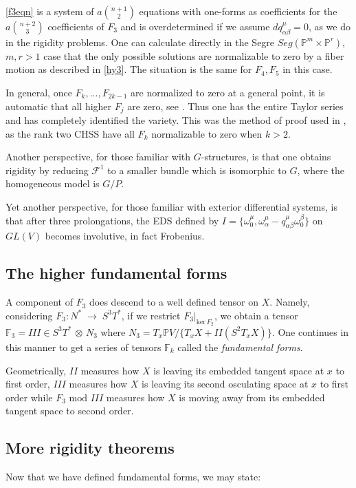\documentclass[11pt]{amsart}
\theoremstyle{definition}
\theoremstyle{remark}
\numberwithin{equation}{section}
\def\ooo#1#2{\omega^{#1}_{#2}}\def\xxx#1#2{x^{#1}_{#2}}
\def\oo#1{\omega^{#1}_0}
\def\qq#1#2#3{q^{#1}_{{#2} {#3}}}
\def\cf{\mathcal F}
\def\BP{\mathbb P}
\def\pp#1{\mathbb P^{#1}}
\def\pp#1{{\mathbb P}^{#1}}
\def\hd{,...,}
\def\FF{\mathbb F}
\def\a{\alpha}
\def\b{\beta}
\def\ot{{\mathord{\,\otimes }\,}}
\def\ra{{\mathord{\;\rightarrow\;}}}
\def\tker{\text{ker}\,}
\def\tmod{\text{ mod }}
\begin{document}
\smallskip

\eqref{f3eqn} is a system of $a\binom{n+1}2$ equations
with one-forms as coefficients for the $a\binom{n+2}3$ coefficients
of $F_3$ and is overdetermined if we assume $d\qq\mu\a\b=0$, as we do
in the rigidity problems. One can calculate
directly  in the Segre
$Seg(\pp m\times \pp r)$, $m,r>1$ case that the only possible solutions are normalizable to zero
by a fiber motion as described in \eqref{hy3}. The situation is the same for $F_4,F_5$
in this case.

In general, once $F_k\hd F_{2k-1}$ are normalized to zero at a general point,
it is automatic that all higher $F_j$ are zero, see \cite{Lci}.
Thus one has the entire Taylor series and has completely identified the variety.
This was the method of proof used in \cite{Lrigid}, as the rank two
CHSS have all $F_k$ normalizable to zero when $k>2$.

Another perspective, for those familiar with $G$-structures, is that one
obtains rigidity by reducing   $\cf^1$ to a smaller bundle which is isomorphic to $G$, where the
homogeneous model is $G/P$.

Yet another perspective, for those familiar with exterior differential systems,
is that after three prolongations, the EDS defined by $I=\{\oo\mu,\ooo\mu\a-\qq\mu\a\b\oo\b\}$
on $GL(V)$ becomes involutive, in fact Frobenius.


\subsection{The higher fundamental forms}\label{ffsect}
A component of  $F_3$ does descend to a well defined tensor
on $X$. Namely, considering
$F_3: N^*\ra S^3T^*$, if we restrict $F_3|_{\tker F_2}$,
we obtain a tensor $\FF_3=III\in S^3T^*\ot N_3$ where $N_3=T_x\BP V/\{ T_xX + II(S^2T_xX)\}$.
One   continues
in this manner to get a series of tensors $\FF_k$ called the {\it fundamental forms}.

Geometrically, $II$ measures how $X$ is leaving its embedded tangent space at $x$ to
first order, $III$ measures how $X$ is leaving its second osculating space at
$x$ to first order while $F_3\tmod III$ measures how $X$ is moving away from
its embedded tangent space to second order.


\subsection{More rigidity theorems}\label{rigidsect}
Now that we have defined fundamental forms, we may state:
\end{document}
